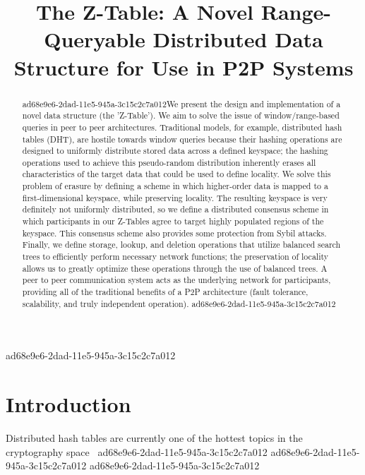 \documentclass[12pt]{article}
\title{The Z-Table: A Novel Range-Queryable Distributed Data Structure for Use in P2P Systems}
\begin{document}
\maketitle

\begin{abstract}
ad68e9e6-2dad-11e5-945a-3c15c2c7a012We present the design and implementation of a novel data structure (the 'Z-Table'). We aim to solve the issue of window/range-based queries in peer to peer architectures. Traditional models, for example,  distributed hash tables (DHT), are hostile towards window queries because their hashing operations are designed to uniformly distribute stored data across a defined keyspace; the hashing operations used to achieve this pseudo-random distribution inherently erases all characteristics of the target data that could be used to define locality. We solve this problem of erasure by defining a scheme in which higher-order data is mapped to a first-dimensional keyspace, while preserving locality. The resulting keyspace is very definitely not uniformly distributed, so we define a distributed consensus scheme in which participants in our Z-Tables agree to target highly populated regions of the keyspace. This consensus scheme also provides some protection from Sybil attacks. Finally, we define storage, lookup, and deletion operations that utilize balanced search trees to efficiently perform necessary network functions; the preservation of locality allows us to greatly optimize these operations through the use of balanced trees. A peer to peer communication system acts as the underlying network for participants, providing all of the traditional benefits of a P2P architecture (fault tolerance, scalability, and truly independent operation).
ad68e9e6-2dad-11e5-945a-3c15c2c7a012\end{abstract}
ad68e9e6-2dad-11e5-945a-3c15c2c7a012

\newpage
\section{Introduction}
Distributed hash tables are currently one of the hottest topics in the cryptography space~\cite{Stoica:2001dj,Rowstron:2001ea,Ratnasamy:2001wn}
ad68e9e6-2dad-11e5-945a-3c15c2c7a012
ad68e9e6-2dad-11e5-945a-3c15c2c7a012\printbibliography
ad68e9e6-2dad-11e5-945a-3c15c2c7a012
\end{document}
